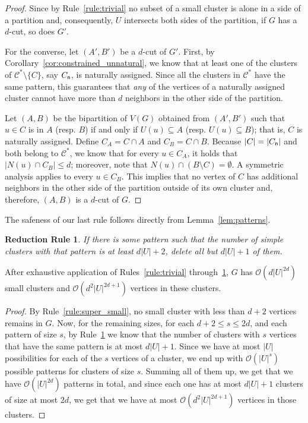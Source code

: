 \documentclass[a4paper,UKenglish,cleveref, autoref]{lipics-v2019}
\newtheorem{rrule}{Reduction Rule}
\newcommand{\bigO}[1]{\mathcal{O}\!\left(#1\right)}
\begin{document}
\begin{proof}
    Since by Rule~\ref{rule:trivial} no subset of a small cluster is alone in a side of a partition and, consequently, $U$ intersects both sides of the partition, if $G$ has a $d$-cut, so does $G'$.

    For the converse, let $(A', B')$ be a $d$-cut of $G'$.
    First, by Corollary~\ref{cor:constrained_unnatural}, we know that at least one of the clusters of $\mathcal{C}^* \setminus \{C\}$, say $C_{{\sf n}}$, is naturally assigned.
    Since all the clusters in $\mathcal{C^*}$ have the same pattern, this guarantees that {\sl any} of the vertices of a naturally assigned cluster cannot have more than $d$ neighbors in the other side of the partition.

    Let $(A,B)$ be the bipartition of $V(G)$ obtained from $(A',B')$ such that $u \in C$ is in $A$ (resp. $B$) if and only if $U(u) \subseteq A$ (resp. $U(u) \subseteq B$); that is, $C$ is naturally assigned.
    Define $C_A = C \cap A$ and $C_B = C \cap B$.
    Because $|C| = |C_{{\sf n}}|$ and both belong to $\mathcal{C}^*$, we know that for every $u \in C_A$, it holds that $|N(u) \cap C_B| \leq d$; moreover, note that $N(u) \cap (B \setminus C) = \emptyset$. A symmetric analysis applies to every $u \in C_B$.
    This implies that no vertex of $C$ has additional neighbors in the other side of the partition outside of its own cluster and, therefore, $(A, B)$ is a $d$-cut of $G$.
\end{proof}

The safeness of our last rule follows directly from Lemma~\ref{lem:patterns}.

\begin{rrule}
    \label{rule:pattern_removal}
    If there is some pattern such that the number of simple clusters with that pattern is at least $d|U|+2$, delete all but $d|U|+1$ of them.
\end{rrule}

\begin{lemma}
    \label{lem:bound2}
    After exhaustive application of Rules~\ref{rule:trivial} through~\ref{rule:pattern_removal}, $G$ has $\bigO{d|U|^{2d}}$ small clusters and $\bigO{d^2|U|^{2d+1}}$ vertices in these clusters.
\end{lemma}

\begin{proof}
    By Rule~\ref{rule:super_small}, no small cluster with less than $d+2$ vertices remains in $G$.
    Now, for the remaining sizes, for each $d+2 \leq s \leq 2d$, and each pattern of size $s$, by Rule~\ref{rule:pattern_removal} we know that the number of clusters with $s$ vertices that have the same pattern is at most $d|U| + 1$.
    Since we have at most $|U|$ possibilities for each of the $s$ vertices of a cluster, we end up with $\bigO{|U|^{s}}$ possible patterns for clusters of size $s$.
    Summing all of them up, we get that we have $\bigO{|U|^{2d}}$ patterns in total, and since each one has at most $d|U| + 1$ clusters of size at most $2d$, we get that we have at most $\bigO{d^2|U|^{2d+1}}$ vertices in those clusters.
\end{proof}
\end{document}
